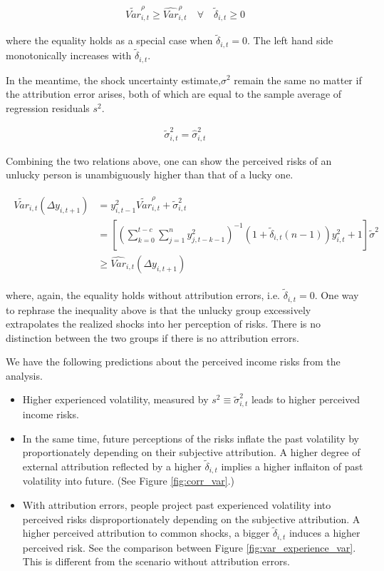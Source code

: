 \documentclass[12pt,notitlepage,onecolumn,aps,pra]{article}
\begin{document}
\begin{eqnarray}
\tilde {Var}^{\rho}_{i,t} \geq \widehat {Var}^{\rho}_{i,t} \quad \forall \quad \tilde\delta_{i,t} \geq 0
\end{eqnarray}

where the equality holds as a special case when
\(\tilde\delta_{i,t} = 0\). The left hand side monotonically increases
with \(\tilde \delta_{i,t}\).

In the meantime, the shock uncertainty estimate,\(\sigma^2\) remain the
same no matter if the attribution error arises, both of which are equal
to the sample average of regression residuals \(s^2\).

\begin{eqnarray}
\tilde{\sigma}^2_{i,t} = \widehat{\sigma}^2_{i,t}
\end{eqnarray}

Combining the two relations above, one can show the perceived risks of
an unlucky person is unambiguously higher than that of a lucky one.

\begin{eqnarray}
\begin{split}
\tilde {Var}_{i,t}(\Delta y_{i,t+1}) & = y_{i,t-1}^2 \tilde{Var}^{\rho}_{i,t} + \tilde{\sigma}^2_{i,t} \\
& = [(\sum^{t-c}_{k=0}\sum^{n}_{j=1}y^2_{j,t-k-1})^{-1}(1+ \tilde\delta_{i,t}(n-1))y^2_{i,t} + 1] \tilde{\sigma}^2\\
& \geq \widehat {Var}_{i,t}(\Delta y_{i,t+1}) 
\end{split}
\end{eqnarray}

where, again, the equality holds without attribution errors, i.e.
\(\tilde \delta_{i,t} = 0\). One way to rephrase the inequality above is
that the unlucky group excessively extrapolates the realized shocks into
her perception of risks. There is no distinction between the two groups
if there is no attribution errors.

We have the following predictions about the perceived income risks from
the analysis.

\begin{itemize}
\item
  Higher experienced volatility, measured by
  \(s^2 \equiv \tilde{\sigma}^2_{i,t}\) leads to higher perceived income
  risks.
\item
  In the same time, future perceptions of the risks inflate the past
  volatility by proportionately depending on their subjective
  attribution. A higher degree of external attribution reflected by a
  higher \(\tilde \delta_{i,t}\) implies a higher inflaiton of past
  volatility into future. (See Figure \ref{fig:corr_var}.)
\item
  With attribution errors, people project past experienced volatility
  into perceived risks disproportionately depending on the subjective
  attribution. A higher perceived attribution to common shocks, a bigger
  \(\tilde \delta_{i,t}\) induces a higher perceived risk. See the
  comparison between Figure \ref{fig:var_experience_var}. This is
  different from the scenario without attribution errors.
\end{itemize}
\end{document}
